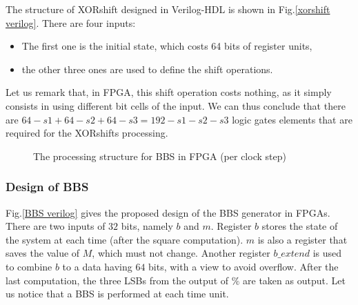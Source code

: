 The structure of XORshift designed in Verilog-HDL is shown in Fig.\ref{xorshift verilog}. There are four inputs:
\begin{itemize}
\item The first one is the initial state, which costs 64 bits 
of register units,
\item the other three ones are used to define the shift operations.
\end{itemize}
Let us remark that, in FPGA, this shift operation costs nothing,
as it simply consists in using different bit cells of the input. 
We can thus conclude that there are $64 - s1 + 64 -s2 + 64 -s3 
= 192 - s1 - s2 - s3$ logic gates elements that are required for
the XORshifts processing. 
\begin{figure}
\begin{center}
\end{center}
\caption{The processing structure for BBS in FPGA (per clock step)}
\end{figure}

\subsubsection{Design of BBS}
Fig.\ref{BBS verilog} gives the proposed design of the BBS generator in FPGAs.
There are two inputs of $32$ bits, namely 
$b$ and $m$. 
Register $b$ stores the state of the system
at each time (after the square computation). 
$m$ is also a register that saves the value of $M$, which must not change.
Another register $b\_extend$ 
is used to combine $b$ to a data having $64$ bits, with a view to avoid overflow. 
After the last computation,
the three LSBs from the output of $\%$ are
taken as output. 
Let us notice that a BBS is
 performed at each time unit.


